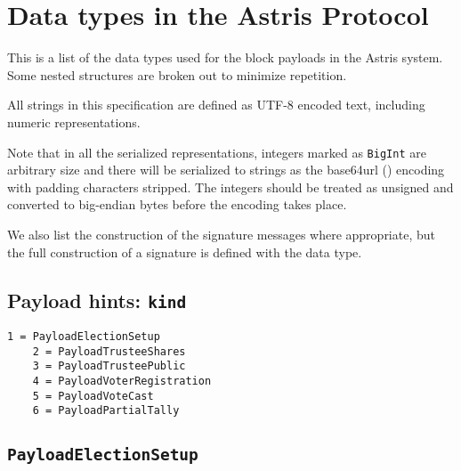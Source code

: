 \chapter{Data types in the Astris Protocol}
\label{appendix:datatypes}

This is a list of the data types used for the block payloads in the Astris system. Some nested structures are broken out to minimize repetition.

All strings in this specification are defined as UTF-8 encoded text, including numeric representations.

Note that in all the serialized representations, integers marked as \texttt{BigInt} are arbitrary size and there will be serialized to strings as the base64url () encoding with padding characters stripped. The integers should be treated as unsigned and converted to big-endian bytes before the encoding takes place.

We also list the construction of the signature messages where appropriate, but the full construction of a signature is defined with the  data type.

\section*{Payload hints: \texttt{kind}}
\label{dt:payload:hints}
\begin{lstlisting}[style=ES6]
    1 = PayloadElectionSetup
    2 = PayloadTrusteeShares
    3 = PayloadTrusteePublic
    4 = PayloadVoterRegistration
    5 = PayloadVoteCast
    6 = PayloadPartialTally
\end{lstlisting}

\section*{\texttt{PayloadElectionSetup}}

